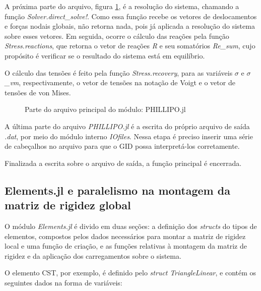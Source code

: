 A próxima parte do arquivo, figura \ref{fig:phillipo.jl_6}, é a resolução do sistema, chamando a função \emph{Solver.direct\_solve!}. Como essa função recebe os vetores de deslocamentos e forças nodais globais, não retorna nada, pois já aplicada a resolução do sistema sobre esses vetores. Em seguida, ocorre o cálculo das reações pela função \emph{Stress.reactions}, que retorna o vetor de reações \emph{R} e seu somatórios \emph{Re\_sum}, cujo propósito é verificar se o resultado do sistema está em equilíbrio.

O cálculo das tensões é feito pela função \emph{Stress.recovery}, para as variáveis \emph{$\sigma$} e \emph{$\sigma$\_vm}, respectivamente, o vetor de tensões na notação de Voigt e o vetor de tensões de von Mises.

\begin{figure}[hbtp]
    \caption{Parte do arquivo principal do módulo: PHILLIPO.jl}
    
    \label{fig:phillipo.jl_6}
\end{figure}

A última parte do arquivo \emph{PHILLIPO.jl} é a escrita do próprio arquivo de saída \emph{.dat}, por meio do módulo interno \emph{IOfiles}. Nessa etapa é preciso inserir uma série de cabeçalhos no arquivo para que o GID possa interpretá-los corretamente. 

Finalizada a escrita sobre o arquivo de saída, a função principal é encerrada.

\subsection{Elements.jl e paralelismo na montagem da matriz de rigidez global}

O módulo \emph{Elements.jl} é divido em duas seções: a definição dos \emph{structs} do tipos de elementos, compostos pelos dados necessários para montar a matriz de rigidez local e uma função de criação, e as funções relativas à montagem da matriz de rigidez e da aplicação dos carregamentos sobre o sistema.


O elemento CST, por exemplo, é definido pelo \emph{struct} \emph{TriangleLinear}, e contém os seguintes dados na forma de variáveis:


